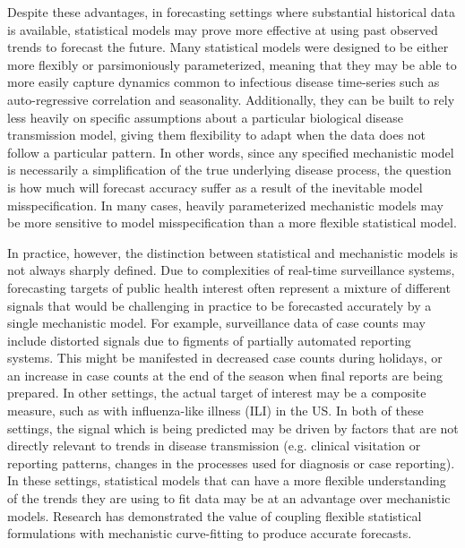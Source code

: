 \documentclass[a4paper]{article}
\begin{document}
Despite these advantages, in forecasting settings where substantial historical data is available, statistical models may prove more effective at using past observed trends to forecast the future.
Many statistical models were designed to be either more flexibly or parsimoniously parameterized, meaning that they may be able to more easily capture dynamics common to infectious disease time-series such as auto-regressive correlation and seasonality.
Additionally, they can be built to rely less heavily on specific assumptions about a particular biological disease transmission model, giving them flexibility to adapt when the data does not follow a particular pattern. 
In other words, since any specified mechanistic model is necessarily a simplification of the true underlying disease process, the question is how much will forecast accuracy suffer as a result of the inevitable model misspecification. 
In many cases, heavily parameterized mechanistic models may be more sensitive to model misspecification than a more flexible statistical model.

In practice, however, the distinction between statistical and mechanistic models is not always sharply defined. 
Due to complexities of real-time surveillance systems, forecasting targets of public health interest often represent a mixture of different signals that would be challenging in practice to be forecasted accurately by a single mechanistic model. 
For example, surveillance data of case counts may include distorted signals due to figments of partially automated reporting systems. This might be manifested in decreased case counts during holidays, or an increase in case counts at the end of the season when final reports are being prepared.\cite{Reich2016a}
In other settings, the actual target of interest may be a composite measure, such as with influenza-like illness (ILI) in the US.\cite{reich2019collaborative}
In both of these settings, the signal which is being predicted may be driven by factors that are not directly relevant to trends in disease transmission (e.g. clinical visitation or reporting patterns, changes in the processes used for diagnosis or case reporting). 
In these settings, statistical models that can have a more flexible understanding of the trends they are using to fit data may be at an advantage over mechanistic models. 
Research has demonstrated the value of coupling flexible statistical formulations with mechanistic curve-fitting to produce accurate forecasts.\cite{Osthus2019,pei2017counteracting,funk2016real,asher2018forecasting} 
\end{document}
